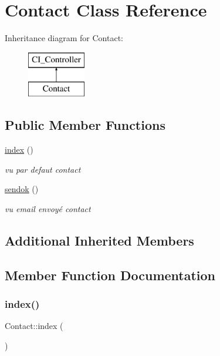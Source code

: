 \hypertarget{class_contact}{}\section{Contact Class Reference}
\label{class_contact}
Inheritance diagram for Contact\+:\begin{figure}[H]
\begin{center}
\leavevmode
\includegraphics[height=2.000000cm]{class_contact}
\end{center}
\end{figure}
\subsection*{Public Member Functions}
\begin{DoxyCompactItemize}
\item 
\mbox{\hyperlink{class_contact_a3430d8b0a516f3c2fbe2f73e1a9faa89}{index}} ()
\begin{DoxyCompactList}\small\item\em vu par defaut contact \end{DoxyCompactList}\item 
\mbox{\hyperlink{class_contact_abd272ba0011aa80d58eafb993f8a434e}{sendok}} ()
\begin{DoxyCompactList}\small\item\em vu email envoyé contact \end{DoxyCompactList}\end{DoxyCompactItemize}
\subsection*{Additional Inherited Members}


\subsection{Member Function Documentation}
\mbox{\label{class_contact_a3430d8b0a516f3c2fbe2f73e1a9faa89}} 
\subsubsection{\texorpdfstring{index()}{index()}}
{\footnotesize\ttfamily Contact\+::index (\begin{DoxyParamCaption}{ }\end{DoxyParamCaption})}



